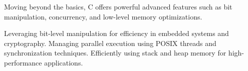 \begin{comment}
8.5.1.2 Designing Efficient Thread Pools

8.5.2 Memory Ordering and Synchronization

8.5.2.1 Understanding Memory Barriers

8.5.2.2 Ensuring Correct Execution in Multi-Core Systems

8.6 C17 and Beyond – High-Performance Computing
8.6.1 Compiler Optimization Techniques

8.6.1.1 Profile-Guided Optimization (PGO)

8.6.1.2 Link-Time Optimization (LTO)

8.6.2 Future of High-Performance C

8.6.2.1 Memory-Safe Techniques in Low-Level Programming

8.6.2.2 Influence of Rust and Secure Code Design
\end{comment}

\begin{NxSBox}
	\begin{NxIDBox}
		Moving beyond the basics, C offers powerful advanced features such as bit manipulation, concurrency, and low-level memory optimizations.
	\end{NxIDBox}
	\begin{NxIDBoxL}
		 Leveraging bit-level manipulation for efficiency in embedded systems and cryptography.
		 Managing parallel execution using POSIX threads and synchronization techniques.
		 Efficiently using stack and heap memory for high-performance applications.
	\end{NxIDBoxL}
\end{NxSBox}

